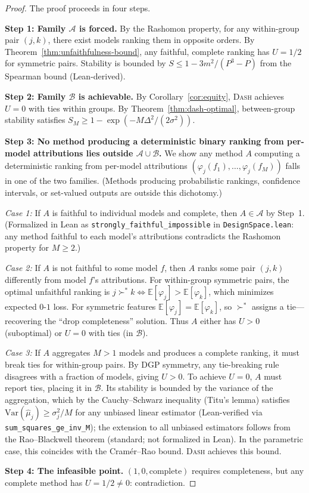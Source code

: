 \documentclass{jmlr}
\newcommand{\E}{\mathbb{E}}
\newcommand{\Var}{\mathrm{Var}}
\newcommand{\DASH}{\textsc{Dash}}
\begin{document}
\begin{proof}
The proof proceeds in four steps.

\textbf{Step 1: Family $\mathcal{A}$ is forced.}
By the Rashomon property, for any within-group pair $(j,k)$, there exist models ranking them in opposite orders. By Theorem~\ref{thm:unfaithfulness-bound}, any faithful, complete ranking has $U = 1/2$ for symmetric pairs. Stability is bounded by $S \leq 1 - 3m^2/(P^3{-}P)$ from the Spearman bound (Lean-derived).

\textbf{Step 2: Family $\mathcal{B}$ is achievable.}
By Corollary~\ref{cor:equity}, \DASH{} achieves $U = 0$ with ties within groups. By Theorem~\ref{thm:dash-optimal}, between-group stability satisfies $S_M \geq 1 - \exp(-M\Delta^2/(2\sigma^2))$.

\textbf{Step 3: No method producing a deterministic binary ranking from per-model attributions lies outside $\mathcal{A} \cup \mathcal{B}$.}
We show any method $A$ computing a deterministic ranking from per-model attributions $(\varphi_j(f_1), \ldots, \varphi_j(f_M))$ falls in one of the two families. (Methods producing probabilistic rankings, confidence intervals, or set-valued outputs are outside this dichotomy.)

\emph{Case 1:} If $A$ is faithful to individual models and complete, then $A \in \mathcal{A}$ by Step~1. (Formalized in Lean as \texttt{strongly\_faithful\_impossible} in \texttt{DesignSpace.lean}: any method faithful to each model's attributions contradicts the Rashomon property for $M \geq 2$.)

\emph{Case 2:} If $A$ is not faithful to some model $f$, then $A$ ranks some pair $(j,k)$ differently from model $f$'s attributions. For within-group symmetric pairs, the optimal unfaithful ranking is $j \succ^* k \Leftrightarrow \E[\varphi_j] > \E[\varphi_k]$, which minimizes expected $0$-$1$ loss. For symmetric features $\E[\varphi_j] = \E[\varphi_k]$, so $\succ^*$ assigns a tie---recovering the ``drop completeness'' solution. Thus $A$ either has $U > 0$ (suboptimal) or $U = 0$ with ties (in $\mathcal{B}$).

\emph{Case 3:} If $A$ aggregates $M > 1$ models and produces a complete ranking, it must break ties for within-group pairs. By DGP symmetry, any tie-breaking rule disagrees with a fraction of models, giving $U > 0$. To achieve $U = 0$, $A$ must report ties, placing it in $\mathcal{B}$. Its stability is bounded by the variance of the aggregation, which by the Cauchy--Schwarz inequality (Titu's lemma) satisfies $\Var(\hat\mu_j) \geq \sigma_j^2/M$ for any unbiased linear estimator (Lean-verified via \texttt{sum\_squares\_ge\_inv\_M}); the extension to all unbiased estimators follows from the Rao--Blackwell theorem (standard; not formalized in Lean). In the parametric case, this coincides with the Cram\'er--Rao bound. \DASH{} achieves this bound.

\textbf{Step 4: The infeasible point.}
$(1, 0, \text{complete})$ requires completeness, but any complete method has $U = 1/2 \neq 0$: contradiction.
\end{proof}
\end{document}
